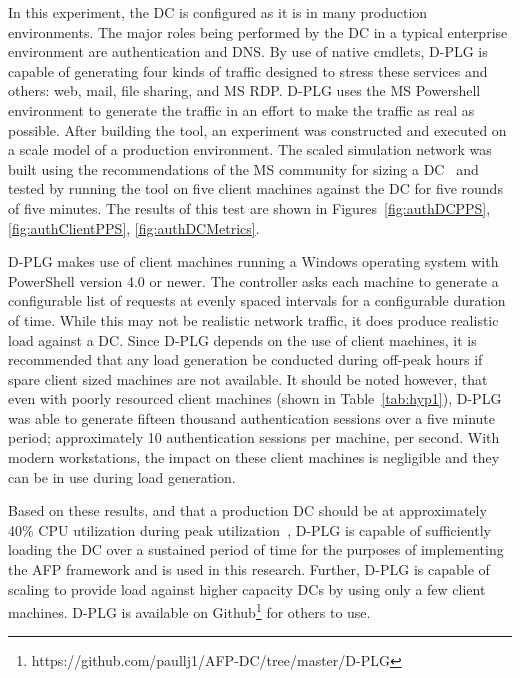 In this experiment, the \ac{DC} is configured as it is in many production
environments.  The major roles being performed by the \ac{DC} in a typical
enterprise environment are authentication and \ac{DNS}.  By use of native
cmdlets, \ac{D-PLG} is capable of generating four kinds of traffic designed to
stress these services and others: web, mail, file sharing, and \ac{MS}
\ac{RDP}.  \ac{D-PLG} uses the \ac{MS} Powershell environment to generate the
traffic in an effort to make the traffic as real as possible.  After building
the tool, an experiment was constructed and executed on a scale model of a
production environment.  The scaled simulation network was built using the
recommendations of the \ac{MS} community for sizing a \ac{DC}~\cite{mak12} and
tested by running the tool on five client machines against the \ac{DC} for five
rounds of five minutes.  The results of this test are shown in
Figures~\ref{fig:authDCPPS}, \ref{fig:authClientPPS}, \ref{fig:authDCMetrics}.

\figAuthDCPPS{4in}
\figAuthClientPPS{4in}
\figAuthDCMetrics{4in}

\ac{D-PLG} makes use of client machines running a Windows operating system with
PowerShell version 4.0 or newer.  The controller asks each machine to generate
a configurable list of requests at evenly spaced intervals for a configurable
duration of time.  While this may not be realistic network traffic, it does
produce realistic load against a \ac{DC}.  Since \ac{D-PLG} depends on the use
of client machines, it is recommended that any load generation be conducted
during off-peak hours if spare client sized machines are not available.  It
should be noted however, that even with poorly resourced client machines (shown
in Table~\ref{tab:hyp1}), \ac{D-PLG} was able to generate fifteen thousand
authentication sessions over a five minute period; approximately 10
authentication sessions per machine, per second.  With modern workstations, the
impact on these client machines is negligible and they can be in use during
load generation.

Based on these results, and that a production \ac{DC} should be at
approximately 40\% \ac{CPU} utilization during peak utilization~\cite{mak12},
\ac{D-PLG} is capable of sufficiently loading the \ac{DC} over a sustained
period of time for the purposes of implementing the \ac{AFP} framework and is
used in this research.  Further, \ac{D-PLG} is capable of scaling to provide
load against higher capacity \ac{DC}s by using only a few client machines.
\ac{D-PLG} is available on
Github\footnote{https://github.com/paullj1/AFP-DC/tree/master/D-PLG} for others
to use.

